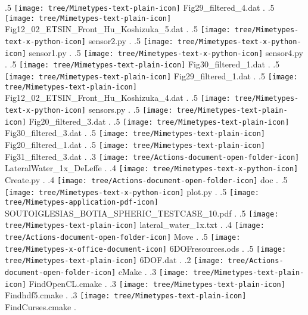 {.5 { \texttt{[image: tree/Mimetypes-text-plain-icon]} Fig29\_filtered\_4.dat }.
.5 { \texttt{[image: tree/Mimetypes-text-plain-icon]} Fig12\_02\_ETSIN\_Front\_Hu\_Koshizuka\_5.dat }.
.5 { \texttt{[image: tree/Mimetypes-text-x-python-icon]} sensor2.py }.
.5 { \texttt{[image: tree/Mimetypes-text-x-python-icon]} sensor1.py }.
.5 { \texttt{[image: tree/Mimetypes-text-x-python-icon]} sensor4.py }.
.5 { \texttt{[image: tree/Mimetypes-text-plain-icon]} Fig30\_filtered\_1.dat }.
.5 { \texttt{[image: tree/Mimetypes-text-plain-icon]} Fig29\_filtered\_1.dat }.
.5 { \texttt{[image: tree/Mimetypes-text-plain-icon]} Fig12\_02\_ETSIN\_Front\_Hu\_Koshizuka\_4.dat }.
.5 { \texttt{[image: tree/Mimetypes-text-x-python-icon]} sensors.py }.
.5 { \texttt{[image: tree/Mimetypes-text-plain-icon]} Fig20\_filtered\_3.dat }.
.5 { \texttt{[image: tree/Mimetypes-text-plain-icon]} Fig30\_filtered\_3.dat }.
.5 { \texttt{[image: tree/Mimetypes-text-plain-icon]} Fig20\_filtered\_1.dat }.
.5 { \texttt{[image: tree/Mimetypes-text-plain-icon]} Fig31\_filtered\_3.dat }.
.3 { \texttt{[image: tree/Actions-document-open-folder-icon]} LateralWater\_1x\_DeLeffe }.
.4 { \texttt{[image: tree/Mimetypes-text-x-python-icon]} Create.py }.
.4 { \texttt{[image: tree/Actions-document-open-folder-icon]} doc }.
.5 { \texttt{[image: tree/Mimetypes-text-x-python-icon]} plot.py }.
.5 { \texttt{[image: tree/Mimetypes-application-pdf-icon]} SOUTOIGLESIAS\_BOTIA\_SPHERIC\_TESTCASE\_10.pdf }.
.5 { \texttt{[image: tree/Mimetypes-text-plain-icon]} lateral\_water\_1x.txt }.
.4 { \texttt{[image: tree/Actions-document-open-folder-icon]} Move }.
.5 { \texttt{[image: tree/Mimetypes-x-office-document-icon]} 6DOFresources.ods }.
.5 { \texttt{[image: tree/Mimetypes-text-plain-icon]} 6DOF.dat }.
.2 { \texttt{[image: tree/Actions-document-open-folder-icon]} cMake }.
.3 { \texttt{[image: tree/Mimetypes-text-plain-icon]} FindOpenCL.cmake }.
.3 { \texttt{[image: tree/Mimetypes-text-plain-icon]} Findhdf5.cmake }.
.3 { \texttt{[image: tree/Mimetypes-text-plain-icon]} FindCurses.cmake }.
}
